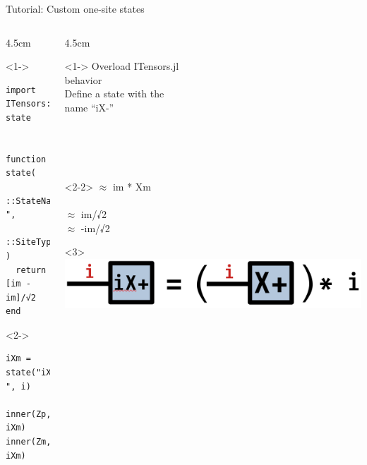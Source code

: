 \begin{frame}[fragile]{Tutorial: Custom one-site states}

\begin{columns}

\begin{column}{4.5cm}

\begin{onlyenv}<1->

\begin{lstlisting}[language=JuliaLocal, style=julia, basicstyle=\small]
import ITensors: state


function state(
  ::StateName"iX-",
  ::SiteType"S=1/2"
)
  return [im -im]/√2
end
\end{lstlisting}

\end{onlyenv}

\begin{onlyenv}<2->
\begin{lstlisting}[language=JuliaLocal, style=julia, basicstyle=\small]
iXm = state("iX-", i)

inner(Zp, iXm)
inner(Zm, iXm)
\end{lstlisting}
\end{onlyenv}

\end{column}

\begin{column}{4.5cm}

\begin{onlyenv}<1->
Overload ITensors.jl\\
behavior\\[\baselineskip]

Define a state with the\\
name ``iX-''\\
~\\
~\\
~\\
~\\
\end{onlyenv}

\begin{onlyenv}<2-2>
$\approx$ im * Xm \\
~\\
$\approx$ im/√2 \\
$\approx$ -im/√2
\end{onlyenv}

\begin{onlyenv}<3>
\includegraphics[width=1.0\textwidth]{
  slides/assets/iXp.png
}
\end{onlyenv}

\end{column}

\end{columns}

\end{frame}
